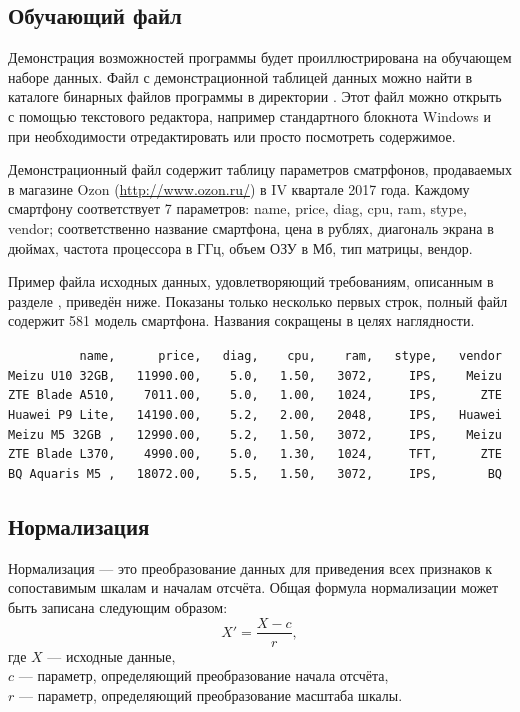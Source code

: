 \documentclass[12pt,tikz]{instruction}
\begin{document}
\subsection{Обучающий файл}
\label{subsec:trainfile}

Демонстрация возможностей программы будет проиллюстрирована на обучающем наборе данных. Файл \SampleFile с демонстрационной таблицей данных можно найти в каталоге бинарных файлов программы в директории \DataCatalog. Этот файл можно открыть с помощью текстового редактора, например стандартного блокнота Windows и при необходимости отредактировать или просто посмотреть содержимое. 

Демонстрационный файл содержит таблицу параметров сматрфонов, продаваемых в магазине Ozon (\url{http://www.ozon.ru/}) в IV квартале 2017 года. Каждому смартфону соответствует 7 параметров: name, price, diag, cpu, ram, stype, vendor; соответственно название смартфона, цена в рублях, диагональ экрана в дюймах, частота процессора в ГГц, объем ОЗУ в Мб, тип матрицы, вендор.

Пример файла исходных данных, удовлетворяющий требованиям, описанным в разделе , приведён ниже. Показаны только несколько первых строк, полный файл содержит 581 модель смартфона. Названия сокращены в целях наглядности.

\begin{tcolorbox}[colframe=black!50!black,coltext=black!25!black,colback=white,title=\textbf{Пример файла входных данных \SampleFile}]
	\verb|          name,      price,   diag,    cpu,    ram,   stype,   vendor |\\
	\verb|Meizu U10 32GB,   11990.00,    5.0,   1.50,   3072,     IPS,    Meizu |\\
	\verb|ZTE Blade A510,    7011.00,    5.0,   1.00,   1024,     IPS,      ZTE |\\
	\verb|Huawei P9 Lite,   14190.00,    5.2,   2.00,   2048,     IPS,   Huawei |\\
	\verb|Meizu M5 32GB ,   12990.00,    5.2,   1.50,   3072,     IPS,    Meizu |\\
	\verb|ZTE Blade L370,    4990.00,    5.0,   1.30,   1024,     TFT,      ZTE |\\
	\verb|BQ Aquaris M5 ,   18072.00,    5.5,   1.50,   3072,     IPS,       BQ |\\	
\end{tcolorbox}

\subsection{Нормализация}
\label{subsec:norm}
Нормализация --- это преобразование данных для приведения всех признаков к сопоставимым шкалам и началам отсчёта. Общая формула нормализации может быть записана следующим образом:
\begin{equation}\label{eq:normalization}
	X'=\dfrac{X-c}{r},
\end{equation}
\noindent где $X$ --- исходные данные,\\
\phantom{где\space}$c$ --- параметр, определяющий преобразование начала отсчёта,\\
\phantom{где\space}$r$ --- параметр, определяющий преобразование масштаба шкалы.
\end{document}
